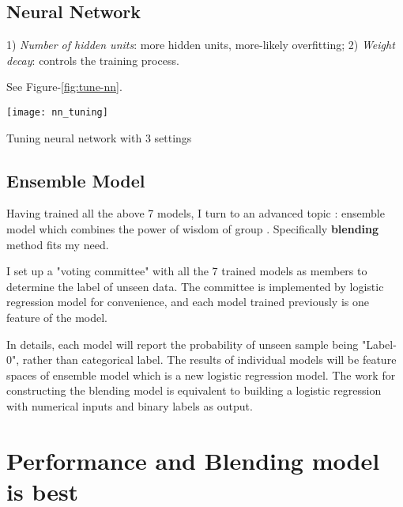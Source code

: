 %

\subsection{Neural Network}
1) \textit{Number of hidden units}: more hidden units, more-likely overfitting; 2) \textit{Weight decay}: controls the training process.

See Figure-\ref{fig:tune-nn}. 
\begin{marginfigure}
\centering
	\texttt{[image: nn\_tuning]}
	\caption{Tuning neural network with 3 settings }
	\label{fig:tune-nn}
\end{marginfigure}

\subsection{Ensemble Model}

Having trained all the above 7 models, I turn to an advanced topic : ensemble model which combines the power of wisdom of group \cite[0.5cm]{mlwave}. Specifically \textbf{blending} method fits my need. 

I set up a "voting committee" with all the 7 trained models as members to determine the label of unseen data. The committee is implemented by logistic regression model for convenience, and each model trained previously is one feature of the model. 

In details, each model will report the probability of unseen sample being "Label-0", rather than categorical label. The results of individual models will be feature spaces of ensemble model which is a new logistic regression model. The work for constructing the blending model is equivalent to building a logistic regression with numerical inputs and binary labels as output. 

\section{Performance and Blending model is best}

